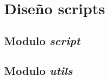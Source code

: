 \chapter{Diseño scripts}
\label{cap:diseño_scripts}

\section{Modulo \textit{script}}
\label{sec:modulo_script}


% 

\section{Modulo \textit{utils}}
\label{sec:modulo_utils}

% 
